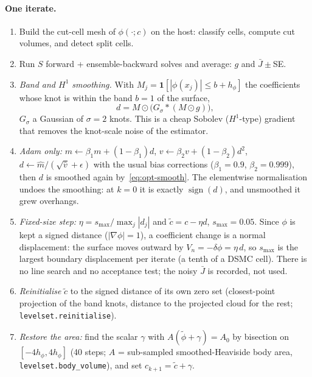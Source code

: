 \documentclass[11pt,a4paper]{article}
\numberwithin{equation}{section}
\newcommand{\ind}{\mathbf{1}}
\newcommand{\code}[1]{\texttt{#1}}
\begin{document}
\paragraph{One iterate.}
\begin{enumerate}
\item Build the cut-cell mesh of $\phi(\cdot;c)$ on the host: classify cells, compute
  cut volumes, and detect split cells.
\item Run $S$ forward + ensemble-backward solves and average: $g$ and $\bar J\pm$SE.
\item \emph{Band and $H^1$ smoothing.}  With $M_j = \ind[|\phi(x_j)|\le b + h_\phi]$ the
  coefficients whose knot is within the band $b = 1$ of the surface,
  \begin{equation}
  \label{eq:opt-smooth}
  d = M\odot\big(G_\sigma * (M\odot g)\big),
  \end{equation}
  $G_\sigma$ a Gaussian of $\sigma = 2$ knots.  This is a cheap Sobolev ($H^1$-type)
  gradient that removes the knot-scale noise of the estimator.
\item \emph{Adam only:}
  $m\leftarrow\beta_1 m+(1-\beta_1)d$, $v\leftarrow\beta_2 v+(1-\beta_2)d^2$,
  $d\leftarrow \hat m/(\sqrt{\hat v}+\epsilon)$ with the usual bias corrections
  ($\beta_1 = 0.9$, $\beta_2 = 0.999$), then $d$ is smoothed again
  by~\eqref{eq:opt-smooth}.  The elementwise normalisation undoes the smoothing: at
  $k = 0$ it is exactly $\operatorname{sign}(d)$, and unsmoothed it grew overhangs.
\item \emph{Fixed-size step:} $\eta = s_{\max}/\max_j|d_j|$ and $\tilde c = c - \eta d$,
  $s_{\max} = 0.05$.  Since $\phi$ is kept a signed distance ($|\nabla\phi| = 1$), a
  coefficient change is a normal displacement: the surface moves outward by
  $V_n = -\delta\phi = \eta\,d$, so $s_{\max}$ is the largest boundary displacement
  per iterate (a tenth of a DSMC cell).  There is no line search and no acceptance
  test; the noisy $\bar J$ is recorded, not used.
\item \emph{Reinitialise} $\tilde c$ to the signed distance of its own zero set
  (closest-point projection of the band knots, distance to the projected cloud for
  the rest; \code{levelset.reinitialise}).
\item \emph{Restore the area:} find the scalar $\gamma$ with
  $A(\tilde\phi + \gamma) = A_0$ by bisection on $[-4h_\phi, 4h_\phi]$ (40 steps;
  $A$ = sub-sampled smoothed-Heaviside body area, \code{levelset.body\_volume}),
  and set $c_{k+1} = \tilde c + \gamma$.
\end{enumerate}
\end{document}
